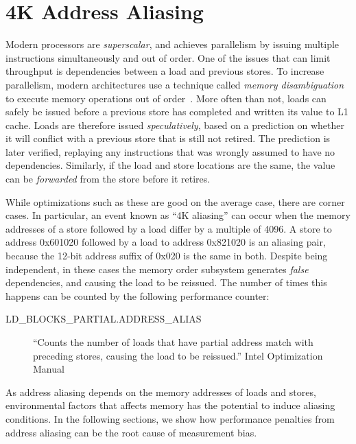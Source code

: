 \documentclass[prodmode,acmtaco]{acmsmall}
\begin{document}
\section{4K Address Aliasing}
\label{sec:aliasing}
Modern processors are \emph{superscalar}, and achieves parallelism by issuing multiple instructions simultaneously and out of order.
One of the issues that can limit throughput is dependencies between a load and previous stores.
To increase parallelism, modern architectures use a technique called \emph{memory disambiguation} to execute memory operations out of order~\cite{Intel:2006:InsideICM:SmartMemoryAccess}. 
More often than not, loads can safely be issued before a previous store has completed and written its value to L1 cache.
Loads are therefore issued \emph{speculatively}, based on a prediction on whether it will conflict with a previous store that is still not retired.
The prediction is later verified, replaying any instructions that was wrongly assumed to have no dependencies.
Similarly, if the load and store locations are the same, the value can be \emph{forwarded} from the store before it retires.

While optimizations such as these are good on the average case, there are corner cases. 
In particular, an event known as ``4K aliasing'' can occur when the memory addresses of a store followed by a load differ by a multiple of 4096.
A store to address 0x601020 followed by a load to address 0x821020 is an aliasing pair, because the 12-bit address suffix of 0x020 is the same in both. 
Despite being independent, in these cases the memory order subsystem generates \emph{false} dependencies, and causing the load to be reissued.
The number of times this happens can be counted by the following performance counter:
\begin{description}
  \item[{\small LD\_BLOCKS\_PARTIAL.ADDRESS\_ALIAS}] ``Counts the number of loads that have partial address match with preceding stores, causing the load to be reissued.'' Intel Optimization Manual~\citeyear[B.3.4.4]{OptimizationManual}
\end{description}

As address aliasing depends on the memory addresses of loads and stores, environmental factors that affects memory has the potential to induce aliasing conditions.
In the following sections, we show how performance penalties from address aliasing can be the root cause of measurement bias.
\end{document}

